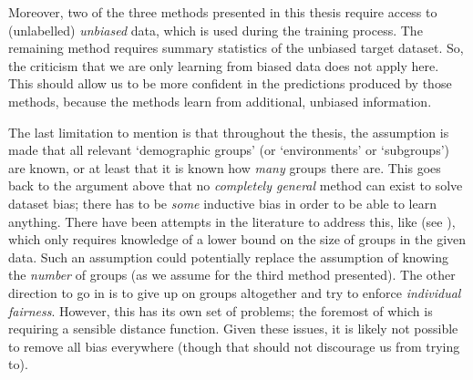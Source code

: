 Moreover, two of the three methods presented in this thesis require access to (unlabelled)
\emph{unbiased} data, which is used during the training process. The remaining method requires
summary statistics of the unbiased target dataset. So, the criticism that we are only learning from
biased data does not apply here. This should allow us to be more confident in the predictions
produced by those methods, because the methods learn from additional, unbiased information.

The last limitation to mention is that throughout the thesis, the assumption is made that all
relevant `demographic groups' (or `environments' or `subgroups') are known, or at least that it is
known how \emph{many} groups there are. This goes back to the argument above that no
\emph{completely general} method can exist to solve dataset bias; there has to be \emph{some}
inductive bias in order to be able to learn anything. There have been attempts in the literature to
address this, like \citet{HasSriNamLia18} (see ),
which only requires knowledge of a lower bound on the size of groups in the given data. Such an
assumption could potentially replace the assumption of knowing the \emph{number} of groups (as we
assume for the third method presented). The other direction to go in is to give up on groups
altogether and try to enforce \emph{individual fairness}. However, this has its own set of
problems; the foremost of which is requiring a sensible distance function. Given these issues, it
is likely not possible to remove all bias everywhere (though that should not discourage us from
trying to).

